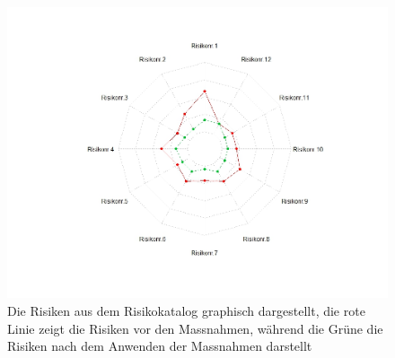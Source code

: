 \documentclass[a4paper]{report}
\begin{document}
\begin{figure}[h!]
	\centering
	\includegraphics[width=\textwidth,keepaspectratio]{Risikomatrix_Spinne}
	\caption{Die Risiken aus dem Risikokatalog graphisch dargestellt, die rote Linie zeigt die Risiken vor den Massnahmen, während die Grüne die Risiken nach dem Anwenden der Massnahmen darstellt}
	\label{fig:Risikomatrix_Spinne}
\end{figure}
\end{document}
